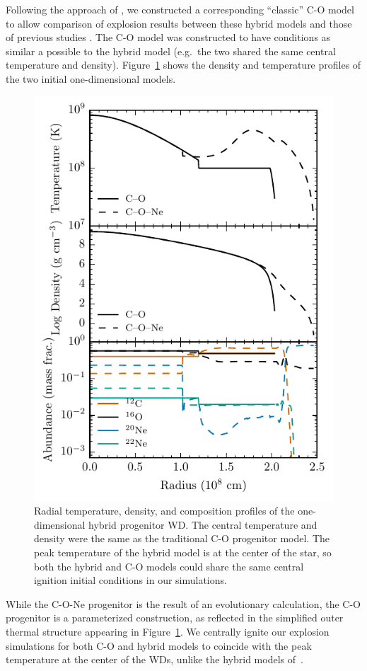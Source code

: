 \documentclass[preprint2]{aastex63}
\begin{document}
Following the approach of \citet{willcoxetal2016}, we constructed a
corresponding ``classic'' C-O model to allow comparison of explosion
results between these hybrid models and those of previous studies
\citep{Krueger2010On-Variations-o,Kruegeretal2012}. The C-O model was 
constructed to have conditions as similar a possible to the hybrid
model (e.g.\  the two shared the same central temperature and density).  
Figure~\ref{fig:init_conds} shows the density and temperature
profiles of the two initial one-dimensional models.
\begin{figure}
\includegraphics[width=\columnwidth]{figures/temp_dens_abund_profile.pdf}
\caption{\label{fig:init_conds}
Radial temperature, density, and  composition profiles of the one-dimensional hybrid
progenitor WD. The central temperature and density were the same as
the traditional C-O progenitor model.
The peak temperature of the hybrid model is at the center of the star,
so both the hybrid and C-O models could share the same central ignition initial conditions in our simulations.
}
\end{figure}
While the C-O-Ne progenitor is the result of an evolutionary calculation, the C-O progenitor is a parameterized construction, as reflected in the simplified outer thermal structure appearing in Figure~\ref{fig:init_conds}.
We centrally ignite our explosion simulations for both C-O and hybrid
models to coincide with the peak temperature at the center of the WDs,
unlike the hybrid models of~\citet{willcoxetal2016}.
\end{document}

